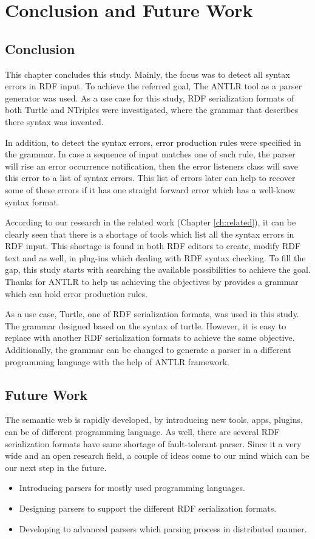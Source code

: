 \chapter{Conclusion and Future Work}
\label{ch:conclusions}
\section{Conclusion}
This chapter concludes this study. Mainly, the focus was to detect all syntax errors in RDF input. To achieve the referred goal, The ANTLR tool as a parser generator was used. As a use case for this study, RDF serialization formats of both Turtle and NTriples were investigated, where the grammar that describes there syntax was invented.

In addition, to detect the syntax errors, error production rules were specified in the grammar. In case a sequence of input matches one of such rule, the parser will rise an error occurrence notification, then the error listeners class will save this error to a list of syntax errors. This list of errors later can help to recover some of these errors if it has one straight forward error which has a well-know syntax format. 

According to our research in the related work (Chapter \ref{ch:related}), it can be clearly seen that there is a shortage of tools which list all the syntax errors in RDF input. This shortage is found in both RDF editors to create, modify RDF text and as well, in plug-ins which dealing with RDF syntax checking. To fill the gap, this study starts with searching the available possibilities to achieve the goal. Thanks for ANTLR to help us achieving the objectives by provides a grammar which can hold error production rules. 

As a use case, Turtle, one of RDF serialization formats, was used in this study. The grammar designed based on the syntax of turtle. However, it is easy to replace with another RDF serialization formats to achieve the same objective. Additionally, the grammar can be changed to generate a parser in a different programming language with the help of ANTLR framework.   


\section{ Future Work}
The semantic web is rapidly developed, by introducing new tools, apps, plugins, can be of different programming language. As well, there are several RDF serialization  formats have same shortage of fault-tolerant parser. Since it a very wide and an open research field, a couple of ideas come to our mind which can be our next step in the future. 
\begin{itemize}
    \item Introducing parsers for mostly used programming languages. 
    \item Designing parsers to support the different RDF serialization formats.
    \item Developing to advanced parsers which parsing process in distributed manner.
\end{itemize}

